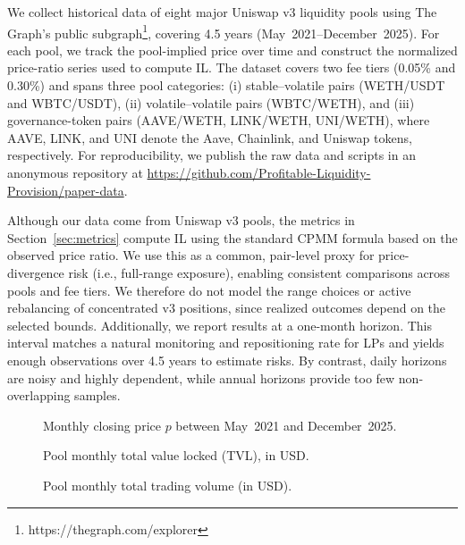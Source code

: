 \documentclass[journal]{IEEEtran}
\begin{document}
We collect historical data of eight major Uniswap v3 liquidity pools using The Graph's public subgraph\footnote{https://thegraph.com/explorer}, covering 4.5 years (May~2021--December~2025).
For each pool, we track the pool-implied price over time and construct the normalized price-ratio series used to compute IL.
The dataset covers two fee tiers (0.05\% and 0.30\%) and spans three pool categories: (i) stable--volatile pairs (WETH/USDT and WBTC/USDT), (ii) volatile--volatile pairs (WBTC/WETH), and (iii) governance-token pairs (AAVE/WETH, LINK/WETH, UNI/WETH), where AAVE, LINK, and UNI denote the Aave, Chainlink, and Uniswap tokens, respectively.
For reproducibility, we publish the raw data and scripts in an anonymous repository at \url{https://github.com/Profitable-Liquidity-Provision/paper-data}. 


Although our data come from Uniswap v3 pools, the metrics in Section~\ref{sec:metrics} compute IL using the standard CPMM formula based on the observed price ratio.
We use this as a common, pair-level proxy for price-divergence risk (i.e., full-range exposure), enabling consistent comparisons across pools and fee tiers. We therefore do not model the range choices or active rebalancing of concentrated v3 positions, since realized outcomes depend on the selected bounds.
Additionally, we report results at a one-month horizon. This interval matches a natural monitoring and repositioning rate for LPs and yields enough observations over 4.5 years to estimate risks. By contrast, daily horizons are noisy and highly dependent, while annual horizons provide too few non-overlapping samples.




\begin{figure}[b]
    \centering
    
    \caption{Monthly closing price $p$ between May~2021 and December~2025.}
    \label{fig:monthly_pools_transformed}
\end{figure}

\begin{figure}[t]
\centering
\resizebox{0.5\textwidth}{!}{%
    
}
\caption{Pool monthly total value locked (TVL), in USD.}
\label{fig:monthly_tvl}
\end{figure}

\begin{figure}[t]
    \centering
    \resizebox{0.5\textwidth}{!}{%
        
    }
    \caption{Pool monthly total trading volume (in USD).}
    \label{fig:monthly_pools_volume}
\end{figure}
\end{document}
